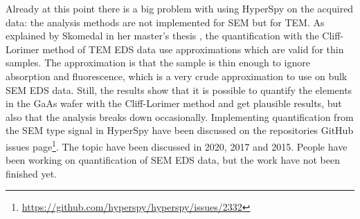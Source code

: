 Already at this point there is a big problem with using HyperSpy on the acquired data: the analysis methods are not implemented for SEM but for TEM.
As explained by Skomedal in her master's thesis \cite{skomedal_improving_2022}, the quantification with the Cliff-Lorimer method of TEM EDS data use approximations which are valid for thin samples.
The approximation is that the sample is thin enough to ignore absorption and fluorescence, which is a very crude approximation to use on bulk SEM EDS data.
Still, the results show that it is possible to quantify the elements in the GaAs wafer with the Cliff-Lorimer method and get plausible results, but also that the analysis breaks down occasionally. %
Implementing quantification from the SEM type signal in HyperSpy have been discussed on the repositories GitHub issues page\footnote{\url{https://github.com/hyperspy/hyperspy/issues/2332}}.
The topic have been discussed in 2020, 2017 and 2015.
People have been working on quantification of SEM EDS data, but the work have not been finished yet.





